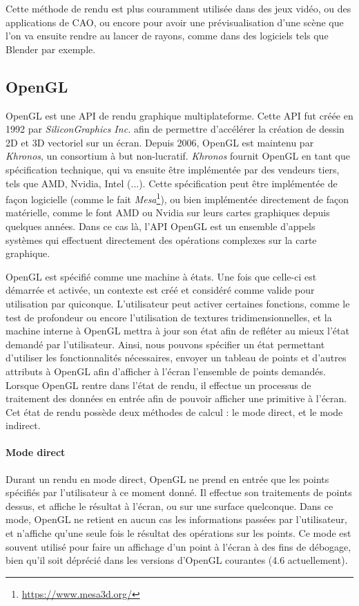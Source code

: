 {{        Cette méthode de rendu est plus couramment utilisée dans des jeux vidéo, ou des applications de CAO, ou encore pour avoir une prévisualisation d'une scène que l'on va ensuite rendre au lancer de rayons, comme dans des logiciels tels que Blender par exemple.
    }
}

\subsection{OpenGL}
{
    OpenGL est une API de rendu graphique multiplateforme. Cette API fut créée en 1992 par \textit{SiliconGraphics Inc.} afin de permettre d'accélérer la création de dessin 2D et 3D vectoriel sur un écran. Depuis 2006, OpenGL est maintenu par \textit{Khronos}, un consortium à but non-lucratif. \textit{Khronos} fournit OpenGL en tant que spécification technique, qui va ensuite être implémentée par des vendeurs tiers, tels que AMD, Nvidia, Intel (...). Cette spécification peut être implémentée de façon logicielle (comme le fait \textit{Mesa}\footnote{\url{https://www.mesa3d.org/}}), ou bien implémentée directement de façon matérielle, comme le font AMD ou Nvidia sur leurs cartes graphiques depuis quelques années. Dans ce cas là, l'API OpenGL est un ensemble d'appels systèmes qui effectuent directement des opérations complexes sur la carte graphique.
    
    OpenGL est spécifié comme une machine à états. Une fois que celle-ci est démarrée et activée, un contexte est créé et considéré comme valide pour utilisation par quiconque. L'utilisateur peut activer certaines fonctions, comme le test de profondeur ou encore l'utilisation de textures tridimensionnelles, et la machine interne à OpenGL mettra à jour son état afin de refléter au mieux l'état demandé par l'utilisateur. Ainsi, nous pouvons spécifier un état permettant d'utiliser les fonctionnalités nécessaires, envoyer un tableau de points et d'autres attributs à OpenGL afin d'afficher à l'écran l'ensemble de points demandés. Lorsque OpenGL rentre dans l'état de rendu, il effectue un processus de traitement des données en entrée afin de pouvoir afficher une primitive à l'écran. Cet état de rendu possède deux méthodes de calcul : le mode direct, et le mode indirect.

    \paragraph{Mode direct}
    {
        Durant un rendu en mode direct, OpenGL ne prend en entrée que les points spécifiés par l'utilisateur à ce moment donné. Il effectue son traitements de points dessus, et affiche le résultat à l'écran, ou sur une surface quelconque. Dans ce mode, OpenGL ne retient en aucun cas les informations passées par l'utilisateur, et n'affiche qu'une seule fois le résultat des opérations sur les points. Ce mode est souvent utilisé pour faire un affichage d'un point à l'écran à des fins de débogage, bien qu'il soit déprécié dans les versions d'OpenGL courantes (4.6 actuellement).
    }

}

